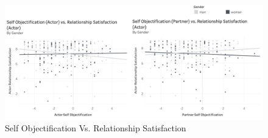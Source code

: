 \documentclass[
  english,
  man]{apa6}
\begin{document}
\begin{figure}
\centering
\includegraphics{Images/SO_vs_RSA.png}
\caption{Self Objectification Vs. Relationship Satisfaction}
\end{figure}
\end{document}

